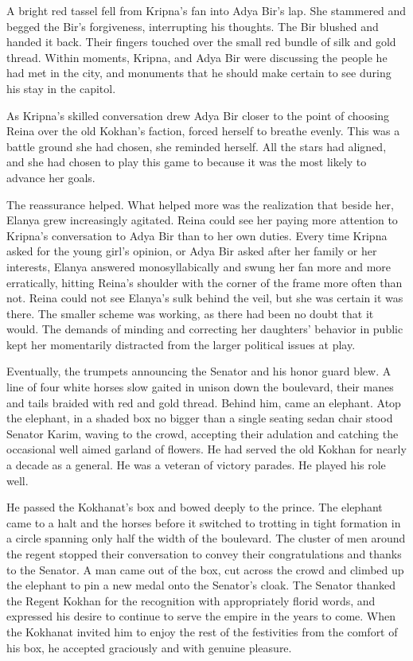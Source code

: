 \documentclass{article}
\begin{document}
	A bright red tassel fell from Kripna’s fan into Adya Bir’s lap. She stammered and begged the Bir’s forgiveness, interrupting his thoughts. The Bir blushed and handed it back. Their fingers touched over the small red bundle of silk and gold thread. Within moments, Kripna, and Adya Bir were discussing the people he had met in the city, and monuments that he should make certain to see during his stay in the capitol. 
	
	As Kripna’s skilled conversation drew Adya Bir closer to the point of choosing Reina over the old Kokhan’s faction, forced herself to breathe evenly. This was a battle ground she had chosen, she reminded herself. All the stars had aligned, and she had chosen to play this game to because it was the most likely to advance her goals. 
	
	The reassurance helped. What helped more was the realization that beside her, Elanya grew increasingly agitated.  Reina could see her paying more attention to Kripna’s conversation to Adya Bir than to her own duties. Every time Kripna asked for the young girl’s opinion, or Adya Bir asked after her family or her interests, Elanya answered monosyllabically and swung her fan more and more erratically, hitting Reina’s shoulder with the corner of the frame more often than not. Reina could not see Elanya’s sulk behind the veil, but she was certain it was there. The smaller scheme was working, as there had been no doubt that it would. The demands of minding and correcting her daughters’ behavior in public kept her momentarily distracted from the larger political issues at play.
	
	Eventually, the trumpets announcing the Senator and his honor guard blew. A line of four white horses slow gaited in unison down the boulevard, their manes and tails braided with red and gold thread. Behind him, came an elephant. Atop the elephant, in a shaded box no bigger than a single seating sedan chair stood Senator Karim, waving to the crowd, accepting their adulation and catching the occasional well aimed garland of flowers. He had served the old Kokhan for nearly a decade as a general. He was a veteran of victory parades. He played his role well.
	
	He passed the Kokhanat’s box and bowed deeply to the prince. The elephant came to a halt and the horses before it switched to trotting in tight formation in a circle spanning only half the width of the boulevard. The cluster of men around the regent stopped their conversation to convey their congratulations and thanks to the Senator. A man came out of the box, cut across the crowd and climbed up the elephant to pin a new medal onto the Senator’s cloak. The Senator thanked the Regent Kokhan for the recognition with appropriately florid words, and expressed his desire to continue to serve the empire in the years to come. When the Kokhanat invited him to enjoy the rest of the festivities from the comfort of his box, he accepted graciously and with genuine pleasure.
	
\end{document}
